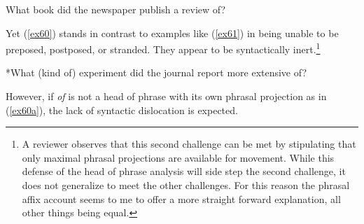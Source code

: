 \documentclass[output=paper,
modfonts
]{LSP/langsci}
\begin{document}
{{{\begin{exe}
\ex\label{ex61b}  What book did the newspaper publish a review of?

\end{exe}

Yet ({\ref{ex60}}) stands in contrast to examples like ({\ref{ex61}}) in being unable to be preposed, postposed, or stranded.  They appear to be syntactically inert.{\footnote{A reviewer observes that this second challenge can be met by stipulating that only maximal phrasal projections are available for movement.  While this defense of the head of phrase analysis will side step the second challenge, it does not generalize to meet the other challenges.  For this reason the phrasal affix account seems to me to offer a more straight forward explanation, all other things being equal.}}
\begin{exe}
\ex \label{ex62}
\begin{xlist}
\end{xlist}
\ex \label{ex62a}
\begin{xlist}
\end{xlist}
\ex \label{ex62b} *What (kind of) experiment did the journal report more extensive of?
\end{exe}
However, if \textit{of} is not a head of phrase with its own phrasal projection as in ({\ref{ex60a}}), the lack of syntactic dislocation is expected.

}}}
\end{document}
